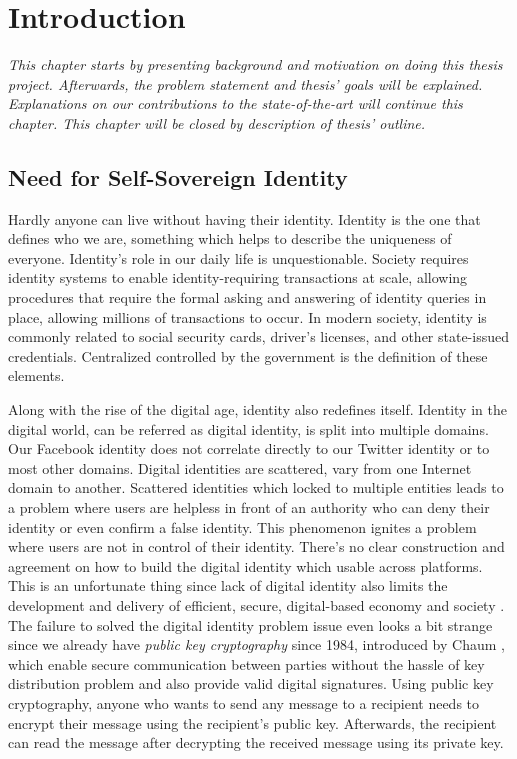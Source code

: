 \chapter{Introduction}

\textit{This chapter starts by presenting background and motivation on doing this thesis project. Afterwards, the problem statement and thesis' goals will be explained. Explanations on our contributions to the state-of-the-art will continue this chapter. This chapter will be closed by description of thesis' outline.}

\section{Need for Self-Sovereign Identity}
Hardly anyone can live without having their identity. Identity is the one that defines who we are, something which helps to describe the uniqueness of everyone.
Identity's role in our daily life is unquestionable. Society requires identity systems to enable identity-requiring transactions at scale, allowing procedures that require the formal asking and answering of identity queries in place, allowing millions of transactions to occur.
In modern society, identity is commonly related to social security cards, driver's licenses, and other state-issued credentials. Centralized controlled by the government is the definition of these elements.

Along with the rise of the digital age, identity also redefines itself. Identity in the digital world, can be referred as digital identity, is split into multiple domains. Our Facebook identity does not correlate directly to our Twitter identity or to most other domains. Digital identities are scattered, vary from one Internet domain to another. Scattered identities which locked to multiple entities leads to a problem where users are helpless in front of an authority who can deny their identity or even confirm a false identity. This phenomenon ignites a problem where users are not in control of their identity.
There's no clear construction and agreement on how to build the digital identity which usable across platforms. This is an unfortunate thing since lack of digital identity also limits the development and delivery of efficient, secure, digital-based economy and society \cite{blueprint}. The failure to solved the digital identity problem issue even looks a bit strange since we already have \textit{public key cryptography} since 1984, introduced by Chaum \cite{chaum}, which enable secure communication between parties without the hassle of key distribution problem and also provide valid digital signatures. Using public key cryptography, anyone who wants to send any message to a recipient needs to encrypt their message using the recipient's public key. Afterwards, the recipient can read the message after decrypting the received message using its private key.

